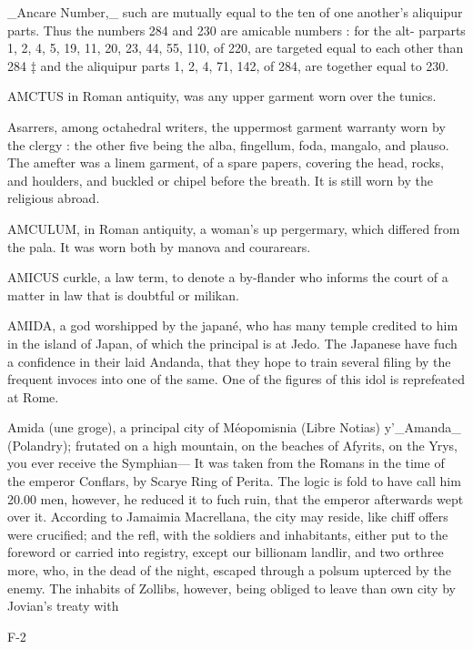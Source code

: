 \_Ancare Number,\_ such are mutually equal to the ten of one another’s aliquipur parts. Thus the numbers 284 and 230 are amicable numbers : for the alt- parparts 1, 2, 4, 5, 19, 11, 20, 23, 44, 55, 110, of 220, are targeted equal to each other than 284 ‡ and the aliquipur parts 1, 2, 4, 71, 142, of 284, are together equal to 230.\par\medskip
AMCTUS in Roman antiquity, was any upper garment worn over the tunics.\par\medskip
Asarrers, among octahedral writers, the uppermost garment warranty worn by the clergy : the other five being the alba, fingellum, foda, mangalo, and plauso. The amefter was a linem garment, of a spare papers, covering the head, rocks, and houlders, and buckled or chipel before the breath. It is still worn by the religious abroad.\par\medskip
AMCULUM, in Roman antiquity, a woman’s up pergermary, which differed from the pala. It was worn both by manova and courarears.\par\medskip
AMICUS curkle, a law term, to denote a by-flander who informs the court of a matter in law that is doubtful or milikan.\par\medskip
AMIDA, a god worshipped by the japané, who has many temple credited to him in the island of Japan, of which the principal is at Jedo. The Japanese have fuch a confidence in their laid Andanda, that they hope to train several filing by the frequent invoces into one of the same. One of the figures of this idol is reprefeated at Rome.\par\medskip
Amida (une groge), a principal city of Méopomisnia (Libre Notias) y'\_Amanda\_ (Polandry); frutated on a high mountain, on the beaches of Afyrits, on the Yrys, you ever receive the Symphian— It was taken from the Romans in the time of the emperor Conflars, by Scarye Ring of Perita. The logic is fold to have call him 20.00 men, however, he reduced it to fuch ruin, that the emperor afterwards wept over it. According to Jamaimia Macrellana, the city may reside, like chiff offers were crucified; and the refl, with the soldiers and inhabitants, either put to the foreword or carried into registry, except our billionam landlir, and two orthree more, who, in the dead of the night, escaped through a polsum upterced by the enemy. The inhabits of Zollibs, however, being obliged to leave than own city by Jovian’s treaty with\par{} F-2\par\medskip
